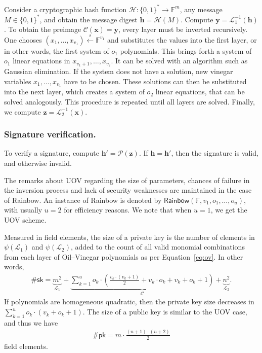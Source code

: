 \documentclass[12pt, a4paper, oneside]{memoir}
\newcommand{\random}{\overset{\mathsf{r}}{\gets}}
\theoremstyle{definition}
\begin{document}
Consider a cryptographic hash function $\mathcal{H} : \{0, 1\}^{*} \to \mathbb{F}^{m}$, any message $M \in \{0, 1\}^{*}$, and obtain the message digest $\mathbf{h} = \mathcal{H}(M)$. Compute $\mathbf{y} = \mathcal{L}_{1}^{-1}(\mathbf{h})$. To obtain the preimage $\mathcal{C}(\mathbf{x}) = \mathbf{y}$, every layer must be inverted recursively. One chooses $(x_{1}, \dots, x_{v_{1}}) \random \mathbb{F}^{v_{1}}$ and substitutes the values into the first layer, or in other words, the first system of $o_{1}$ polynomials. This brings forth a system of $o_{1}$ linear equations in $x_{v_{1} + 1}, \dots, x_{v_{2}}$. It can be solved with an algorithm such as Gaussian elimination. If the system does not have a solution, new vinegar variables $x_{1}, \dots, x_{v_{1}}$ have to be chosen. These solutions can then be substituted into the next layer, which creates a system of $o_{2}$ linear equations, that can be solved analogously. This procedure is repeated until all layers are solved. Finally, we compute $\mathbf{z} = \mathcal{L}_{2}^{-1}(\mathbf{x})$.

\subsubsection{Signature verification.}

To verify a signature, compute $\mathbf{h'} = \mathcal{P}(\mathbf{z})$. If $\mathbf{h} = \mathbf{h'}$, then the signature is valid, and otherwise invalid.

\vspace{4mm}\noindent
The remarks about UOV regarding the size of parameters, chances of failure in the inversion process and lack of security weaknesses are maintained in the case of Rainbow. An instance of Rainbow is denoted by $\mathsf{Rainbow}(\mathbb{F}, v_{1}, o_{1}, \dots, o_{u})$, with usually $u = 2$ for efficiency reasons. We note that when $u = 1$, we get the UOV scheme.

Measured in field elements, the size of a private key is the number of elements in $\psi(\mathcal{L}_{1})$ and $\psi(\mathcal{L}_{2})$, added to the count of all valid monomial combinations from each layer of Oil--Vinegar polynomials as per Equation~\ref{eq:ov}. In other words,
\begin{align}\label{eq:priv}
  \#\mathsf{sk} = \underbrace{m^{2}}_{\mathcal{L}_{1}} 
    + \underbrace{\sum_{k = 1}^{u} o_{k} \cdot \left( \frac{v_{k} \cdot (v_{k} + 1)}{2} + v_{k} \cdot o_{k} + v_{k} + o_{k} + 1 \right)}_{\mathcal{C}}
    + \underbrace{n^{2}}_{\mathcal{L}_{2}}.
\end{align}
If polynomials are homogeneous quadratic, then the private key size decreases in $\sum_{k = 1}^{u} o_{k} \cdot (v_{k} + o_{k} + 1)$. The size of a public key is similar to the UOV case, and thus we have
\begin{align}
  \#\mathsf{pk} = m \cdot \frac{(n + 1) \cdot (n + 2)}{2}
\end{align}
field elements.
\end{document}
